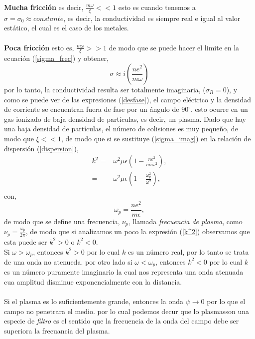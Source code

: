 \documentclass[11pt,fleqn]{book} %
\begin{document}
 \textbf{Mucha fricci\'on} es decir, $\frac{m\omega}{\xi}<<1$ esto es cuando tenemos a $\sigma=\sigma_0\approx constante$, es decir, la conductividad es siempre real e igual al valor est\'atico, el cual es el caso de los metales.\\\\
 \textbf{Poca fricci\'on} esto es, $\frac{m\omega}{\xi}>>1$ de modo que se puede hacer el limite en la ecuaci\'on (\ref{sigma_frec}) y obtener,
 \begin{equation}  \label{sigma_imag}
 \sigma\approx i\left( \frac{ne^2}{m\omega} \right)
 \end{equation}
  por lo tanto, la conductividad resulta ser totalmente imaginaria,  ($\sigma_R=0$), y como se puede ver de las expresiones (\ref{desfase}), el campo el\'ectrico y la densidad de corriente se encuentran fuera de fase por un \'angulo de $90^{\circ}$. esto ocurre en un gas ionizado de baja densidad de part\'iculas, es decir, un plasma. Dado que hay una baja densidad de part\'iculas, el n\'umero de colisiones es muy pequeño, de modo que $\xi<<1$, de modo que si se sustituye (\ref{sigma_imag}) en la relaci\'on de dispersi\'on (\ref{dispersion}),
\begin{equation} \label{k^2}
\begin{split}
k^2=&\omega^2\mu\epsilon\left( 1-\frac{ne^2}{m\epsilon\omega^2} \right),\\
=&\omega^2\mu\epsilon\left( 1-\frac{\omega_{p}^2}{\omega^2} \right),\\
\end{split}
\end{equation}
con,
\begin{equation}
\omega_p=\frac{ne^2}{m\epsilon},
\end{equation}
de modo que se define una frecuencia, $\nu_p$, llamada \textit{frecuencia de plasma}, como $\nu_p=\frac{\omega_p}{2\pi}$, de modo que si analizamos un poco la expresi\'on (\ref{k^2}) observamos que esta puede ser $k^2>0$ o $k^2<0$.\\
Si $\omega>\omega_p$, entonces $k^2>0$ por lo cual $k$ es un n\'umero real, por lo tanto se trata de una onda no atenueda. por otro lado si $\omega<\omega_p$, entonces $k^2<0$ por lo cual $k$ es un n\'umero puramente imaginario la cual nos representa una onda atenuada cua amplitud disminue exponencialmente  con la distancia. \\\\
Si el plasma es lo suficientemente grande, entonces la onda $\psi\rightarrow 0$ por lo que el campo no penetrara el medio. por lo cual podemos decur que lo plasmasson una especie de \textit{filtro} es el sentido que la frecuencia de la onda del campo debe ser superiora la frecuancia del plasma.
\end{document}
